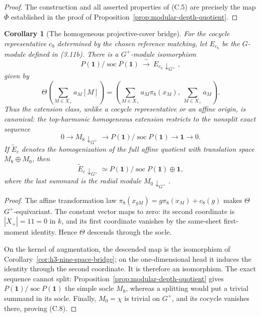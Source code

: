 \documentclass[11pt]{article}
\newtheorem{corollary}[theorem]{Corollary}
\theoremstyle{definition}
\theoremstyle{remark}
\begin{document}
\begin{proof}
The construction and all asserted properties of (C.5) are precisely the
map \(\overline\Phi\) established in the proof of
Proposition~\ref{prop:modular-depth-quotient}.
\end{proof}

\begin{corollary}[The homogeneous projective-cover bridge]
\label{cor:h3-homogeneous-projective-cover}
For the cocycle representative \(c_8\) determined by the chosen
reference matching, let \(E_{c_8}\) be the \(G\)-module defined in
(3.11b).
There is a \(G^+\)-module isomorphism
\[
 P(\mathbf1)/\operatorname{soc}P(\mathbf1)
 \ \xrightarrow{\ \sim\ }\ E_{c_8}\!\downarrow_{G^+},          \tag{C.6}
\]
given by
\[
 \Theta\!\left(\sum_{M\in X_+}a_M[M]\right)
   =\left(\sum_{M\in X_+}a_M\pi_8(x_M),\ \sum_{M\in X_+}a_M\right).
                                                               \tag{C.7}
\]
Thus the extension class, unlike a cocycle representative or an affine
origin, is canonical: the top-harmonic homogeneous extension restricts
to the nonsplit exact sequence
\[
 0\longrightarrow M_8\!\downarrow_{G^+}
 \longrightarrow P(\mathbf1)/\operatorname{soc}P(\mathbf1)
 \longrightarrow \mathbf1\longrightarrow0 .
\]
If \(\widetilde E_c\) denotes the homogenization of the full affine
quotient with translation space \(M_8\oplus M_0\), then
\[
 \widetilde E_c\!\downarrow_{G^+}\simeq
 P(\mathbf1)/\operatorname{soc}P(\mathbf1)\oplus\mathbf1,      \tag{C.8}
\]
where the last summand is the radial module \(M_0\!\downarrow_{G^+}\).
\end{corollary}

\begin{proof}
The affine transformation law
\(\pi_8(x_{gM})=g\pi_8(x_M)+c_8(g)\) makes \(\Theta\)
\(G^+\)-equivariant.  The constant vector maps to zero: its second
coordinate is \(|X_+|=11=0\) in \(k\), and its first coordinate
vanishes by the same-sheet first-moment identity.  Hence \(\Theta\)
descends through the socle.

On the kernel of augmentation, the descended map is the isomorphism
of Corollary~\ref{cor:h3-nine-space-bridge}; on the one-dimensional
head it induces the identity through the second coordinate.  It is
therefore an isomorphism.  The exact sequence cannot split:
Proposition~\ref{prop:modular-depth-quotient} gives
\(P(\mathbf1)/\operatorname{soc}P(\mathbf1)\) the simple socle \(M_8\),
whereas a splitting would put a trivial summand in its socle.  Finally,
\(M_0=\chi\) is trivial on \(G^+\), and its cocycle vanishes there,
proving (C.8).
\end{proof}
\end{document}
